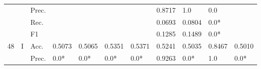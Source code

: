\begin{tabular}{cclllllllll}
                                                                                                               &                                   & Prec.                                                &                         &                         &                              &                         & 0.8717                                                                       & 1.0                                                                         & 0.0                                       &                                           \\
                                                                                                               &                                   & Rec.                                                 &                         &                         &                              &                         & 0.0693                                                                       & 0.0804                                                                      & 0.0*                                      &                                           \\
                                                                                                               &                                   & F1                                                   &                         &                         &                              &                         & 0.1285                                                                       & 0.1489                                                                      & 0.0*                                      &                                           \\ 
    \midrule
    \multirow{12}{*}{48}                                                                                       & \multirow{4}{*}{I}                & Acc.                                                 & 0.5073                  & 0.5065                  & 0.5351                       & 0.5371                  & 0.5241                                                                       & 0.5035                                                                      & 0.8467                                    & 0.5010                                    \\
                                                                                                               &                                   & Prec.                                                & 0.0*                    & 0.0*                    & 0.0*                         & 0.0*                    & 0.9263                                                                       & 0.0*                                                                        & 1.0                                       & 0.0*                                      \\

\end{tabular}

